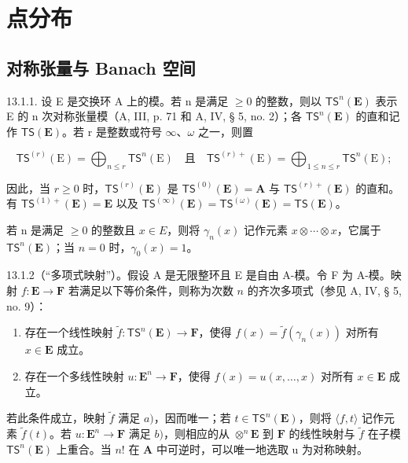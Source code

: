 \section{点分布}

\subsection{对称张量与 Banach 空间}

13.1.1. 设 E 是交换环 A 上的模。若 n 是满足 \(\geqslant0\) 的整数，则以 \(\mathsf{TS}^{n}(\mathbf{E})\) 表示 E 的 n 次对称张量模（A, III, p. 71 和 A, IV, § 5, no. 2）；各 \(\mathsf{TS}^{n}(\mathbf{E})\) 的直和记作 \(\mathsf{TS}(\mathbf{E})\)。若 r 是整数或符号 \(\infty\)、\(\omega\) 之一，则置

\[
\mathsf{TS}^{(r)}(\mathrm{E})=\bigoplus_{n\leqslant r}\mathsf{TS}^{n}(\mathrm{E})\quad\text{且}\quad\mathsf{TS}^{(r)+}(\mathrm{E})=\bigoplus_{1\leqslant n\leqslant r}\mathsf{TS}^{n}(\mathrm{E});
\]

因此，当 \(r \geqslant 0\) 时，\(\mathsf{TS}^{(r)}(\mathbf{E})\) 是 \(\mathsf{TS}^{(0)}(\mathbf{E}) = \mathbf{A}\) 与 \(\mathsf{TS}^{(r)+}(\mathbf{E})\) 的直和。有 \(\mathsf{TS}^{(1)+}(\mathbf{E}) = \mathbf{E}\) 以及 \(\mathsf{TS}^{(\infty)}(\mathbf{E}) = \mathsf{TS}^{(\omega)}(\mathbf{E}) = \mathsf{TS}(\mathbf{E})\)。

若 n 是满足 \(\geqslant0\) 的整数且 \(x\in E\)，则将 \(\gamma_{n}(x)\) 记作元素 \(x\otimes\cdots\otimes x\)，它属于 \(\mathsf{TS}^{n}(\mathbf{E})\)；当 \(n=0\) 时，\(\gamma_{0}(x)=1\)。

13.1.2（“多项式映射”）。假设 A 是无限整环且 E 是自由 A-模。令 F 为 A-模。映射 \(f\colon\mathbf{E}\to\mathbf{F}\) 若满足以下等价条件，则称为次数 \(n\) 的齐次多项式（参见 A, IV, § 5, no. 9）：

\begin{enumerate}
\def\labelenumi{\alph{enumi})}
\item
  存在一个线性映射 \(\tilde{f}\colon\mathsf{TS}^{n}(\mathbf{E})\to\mathbf{F}\)，使得 \(f(x)=\tilde{f}(\gamma_{n}(x))\) 对所有 \(x\in\mathbf{E}\) 成立。
\item
  存在一个多线性映射 \(u: \mathbf{E}^{n} \to \mathbf{F}\)，使得 \(f(x) = u(x, \ldots, x)\) 对所有 \(x \in \mathbf{E}\) 成立。
\end{enumerate}

若此条件成立，映射 \(\tilde{f}\) 满足 \(a)\)，因而唯一；若 \(t \in \mathsf{TS}^n(\mathbf{E})\)，则将 \(\langle f, t \rangle\) 记作元素 \(\tilde{f}(t)\)。若 \(u: \mathbf{E}^n \to \mathbf{F}\) 满足 \(b)\)，则相应的从 \(\otimes^n\mathbf{E}\) 到 \(\mathbf{F}\) 的线性映射与 \(\tilde{f}\) 在子模 \(\mathsf{TS}^n(\mathbf{E})\) 上重合。当 \(n!\) 在 \(\mathbf{A}\) 中可逆时，可以唯一地选取 u 为对称映射。

